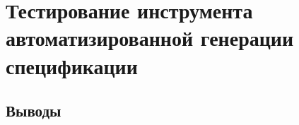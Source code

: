 \chapter{Тестирование инструмента автоматизированной генерации спецификации}

\blindtext

\section{Выводы}
